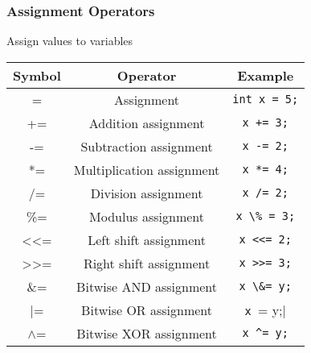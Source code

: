 \documentclass[11pt,A4]{article}
\begin{document}
            \subsubsection{Assignment Operators}
            Assign values to variables
            \begin{table}[h]
                \centering
                \setlength{\arrayrulewidth}{0.3mm}
                \renewcommand{\arraystretch}{1.2}
                \begin{tabular}{ccc}
                    \toprule
                    Symbol & Operator & Example \\
                    \midrule
                    = & Assignment & \verb|int x = 5;| \\
                    \arrayrulecolor{gray!50}\cmidrule(lr){1-3}\arrayrulecolor{black}
                    += & Addition assignment & \verb|x += 3;| \\
                    \arrayrulecolor{gray!50}\cmidrule(lr){1-3}\arrayrulecolor{black}
                    -= & Subtraction assignment & \verb|x -= 2;| \\
                    \arrayrulecolor{gray!50}\cmidrule(lr){1-3}\arrayrulecolor{black}
                    *= & Multiplication assignment & \verb|x *= 4;| \\
                    \arrayrulecolor{gray!50}\cmidrule(lr){1-3}\arrayrulecolor{black}
                    /= & Division assignment & \verb|x /= 2;| \\
                    \arrayrulecolor{gray!50}\cmidrule(lr){1-3}\arrayrulecolor{black}
                    \%= & Modulus assignment & \verb|x \% = 3;| \\
                    \arrayrulecolor{gray!50}\cmidrule(lr){1-3}\arrayrulecolor{black}
                    <<= & Left shift assignment & \verb|x <<= 2;| \\
                    \arrayrulecolor{gray!50}\cmidrule(lr){1-3}\arrayrulecolor{black}
                    >>= & Right shift assignment & \verb|x >>= 3;| \\
                    \arrayrulecolor{gray!50}\cmidrule(lr){1-3}\arrayrulecolor{black}
                    \&= & Bitwise AND assignment & \verb|x \&= y;| \\
                    \arrayrulecolor{gray!50}\cmidrule(lr){1-3}\arrayrulecolor{black}
                    |= & Bitwise OR assignment & \verb|x |= y;| \\
                    \arrayrulecolor{gray!50}\cmidrule(lr){1-3}\arrayrulecolor{black}
                    $\wedge$= & Bitwise XOR assignment & \verb|x ^= y;| \\
                    \bottomrule
                \end{tabular}
            \end{table}
\end{document}
